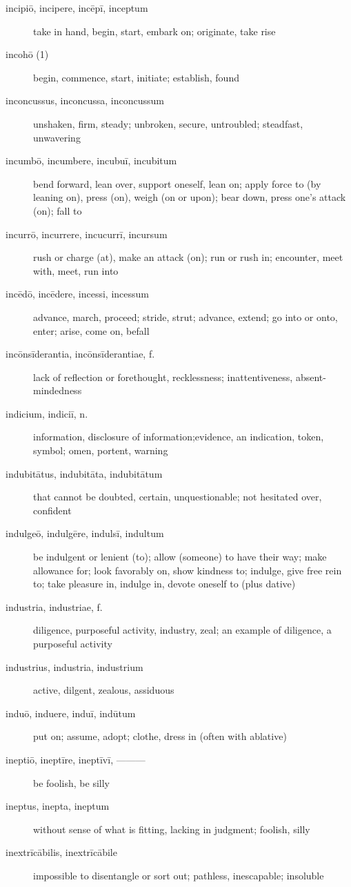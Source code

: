 \begin{description}
    \item[incipiō, incipere, incēpī, inceptum] take in hand, begin, start, embark on; originate, take rise
    \item[incohō (1)] begin, commence, start, initiate; establish, found
    \item[inconcussus, inconcussa, inconcussum] unshaken, firm, steady; unbroken, secure, untroubled; steadfast, unwavering
    \item[incumbō, incumbere, incubuī, incubitum] bend forward, lean over, support oneself, lean on; apply force to (by leaning on), press (on), weigh (on or upon); bear down, press one's attack (on); fall to
    \item[incurrō, incurrere, incucurrī, incursum] rush or charge (at), make an attack (on); run or rush in; encounter, meet with, meet, run into
    \item[incēdō, incēdere, incessi, incessum] advance, march, proceed; stride, strut; advance, extend; go into or onto, enter; arise, come on, befall
    \item[incōnsīderantia, incōnsīderantiae, f.] lack of reflection or forethought, recklessness; inattentiveness, absent-mindedness
    \item[indicium, indiciī, n.] information, disclosure of information;evidence, an indication, token, symbol; omen, portent, warning
    \item[indubitātus, indubitāta, indubitātum] that cannot be doubted, certain, unquestionable; not hesitated over, confident
    \item[indulgeō, indulgēre, indulsī, indultum] be indulgent or lenient (to); allow (someone) to have their way; make allowance for; look favorably on, show kindness to; indulge, give free rein to; take pleasure in, indulge in, devote oneself to (plus dative)
    \item[industria, industriae, f.] diligence, purposeful activity, industry, zeal; an example of diligence, a purposeful activity
    \item[industrius, industria, industrium] active, dilgent, zealous, assiduous
    \item[induō, induere, induī, indūtum] put on; assume, adopt; clothe, dress in (often with ablative)
    \item[ineptiō, ineptīre, ineptīvī, ———] be foolish, be silly
    \item[ineptus, inepta, ineptum] without sense of what is fitting, lacking in judgment; foolish, silly
    \item[inextrīcābilis, inextrīcābile] impossible to disentangle or sort out; pathless, inescapable; insoluble

\end{description}
